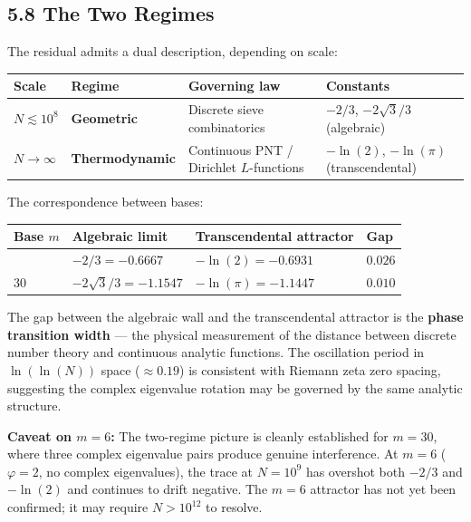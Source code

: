 \documentclass[
  11pt,
]{article}
\newcounter{none} %
\numberwithin{equation}{section}
\begin{document}
\subsection{5.8 The Two Regimes}\label{the-two-regimes}

The residual admits a dual description, depending on scale:

{\def\LTcaptype{none} %
\begin{longtable}[]{@{}
  >{\raggedright\arraybackslash}p{}
  >{\raggedright\arraybackslash}p{}
  >{\raggedright\arraybackslash}p{}
  >{\raggedright\arraybackslash}p{}@{}}
\toprule\noalign{}
Scale & Regime & Governing law & Constants \\
\midrule\noalign{}
\endhead
\bottomrule\noalign{}
\endlastfoot
\(N \lesssim 10^8\) & \textbf{Geometric} & Discrete sieve combinatorics
& \(-2/3\), \(-2\sqrt{3}/3\) (algebraic) \\
\(N \to \infty\) & \textbf{Thermodynamic} & Continuous PNT / Dirichlet
\(L\)-functions & \(-\ln(2)\), \(-\ln(\pi)\) (transcendental) \\
\end{longtable}
}

The correspondence between bases:

{\def\LTcaptype{none} %
\begin{longtable}[]{@{}llll@{}}
\toprule\noalign{}
Base \(m\) & Algebraic limit & Transcendental attractor & Gap \\
\midrule\noalign{}
\endhead
\bottomrule\noalign{}
\endlastfoot
6 & \(-2/3 = -0.6667\) & \(-\ln(2) = -0.6931\) & \(0.026\) \\
30 & \(-2\sqrt{3}/3 = -1.1547\) & \(-\ln(\pi) = -1.1447\) & \(0.010\) \\
\end{longtable}
}

The gap between the algebraic wall and the transcendental attractor is
the \textbf{phase transition width} --- the physical measurement of the
distance between discrete number theory and continuous analytic
functions. The oscillation period in \(\ln(\ln(N))\) space
(\(\approx 0.19\)) is consistent with Riemann zeta zero spacing,
suggesting the complex eigenvalue rotation may be governed by the same
analytic structure.

\textbf{Caveat on \(m = 6\):} The two-regime picture is cleanly
established for \(m = 30\), where three complex eigenvalue pairs produce
genuine interference. At \(m = 6\) (\(\varphi = 2\), no complex
eigenvalues), the trace at \(N = 10^9\) has overshot both \(-2/3\) and
\(-\ln(2)\) and continues to drift negative. The \(m = 6\) attractor has
not yet been confirmed; it may require \(N > 10^{12}\) to resolve.
\end{document}
